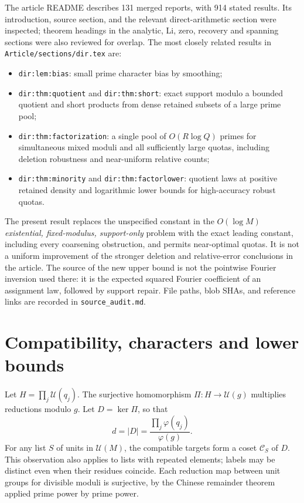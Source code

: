\documentclass[11pt]{article}
\theoremstyle{definition}\newtheorem{remark}[theorem]{Remark}
\newcommand{\G}{\mathcal U}
\newcommand{\comp}{\mathcal C}
\begin{document}
The article README describes 131 merged reports, with 914 stated results. Its introduction, source section, and the relevant direct-arithmetic section were inspected; theorem headings in the analytic, Li, zero, recovery and spanning sections were also reviewed for overlap. The most closely related results in \texttt{Article/sections/dir.tex} are:
\begin{itemize}
\item \texttt{dir:lem:bias}: small prime character bias by smoothing;
\item \texttt{dir:thm:quotient} and \texttt{dir:thm:short}: exact support modulo a bounded quotient and short products from dense retained subsets of a large prime pool;
\item \texttt{dir:thm:factorization}: a single pool of $O(R\log Q)$ primes for simultaneous mixed moduli and all sufficiently large quotas, including deletion robustness and near-uniform relative counts;
\item \texttt{dir:thm:minority} and \texttt{dir:thm:factorlower}: quotient laws at positive retained density and logarithmic lower bounds for high-accuracy robust quotas.
\end{itemize}
The present result replaces the unspecified constant in the $O(\log M)$ \emph{existential, fixed-modulus, support-only} problem with the exact leading constant, including every coarsening obstruction, and permits near-optimal quotas. It is not a uniform improvement of the stronger deletion and relative-error conclusions in the article. The source of the new upper bound is not the pointwise Fourier inversion used there: it is the expected squared Fourier coefficient of an assignment law, followed by support repair. File paths, blob SHAs, and reference links are recorded in \texttt{source\_audit.md}.

\section{Compatibility, characters and lower bounds}\label{sec:lower}
Let $H=\prod_j\G(q_j)$. The surjective homomorphism $\Pi:H\to\G(g)$ multiplies reductions modulo $g$. Let $D=\ker\Pi$, so that
\begin{equation}\label{eq:D}
 d=|D|=\frac{\prod_j\varphi(q_j)}{\varphi(g)}.
\end{equation}
For any list $S$ of units in $\G(M)$, the compatible targets form a coset $\comp_S$ of $D$. This observation also applies to lists with repeated elements; labels may be distinct even when their residues coincide. Each reduction map between unit groups for divisible moduli is surjective, by the Chinese remainder theorem applied prime power by prime power.
\end{document}
